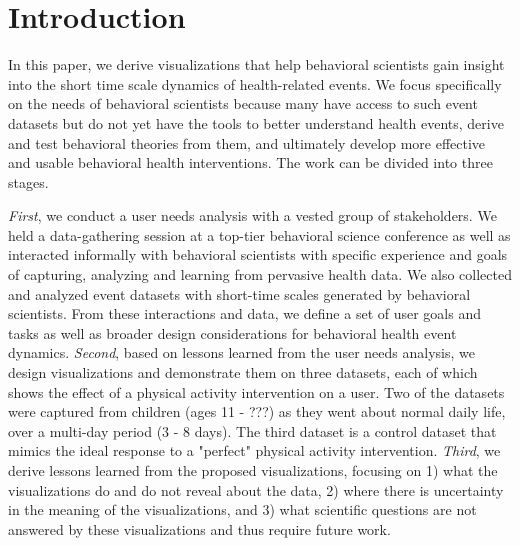 
\section{Introduction} %



In this paper, we derive visualizations that help behavioral scientists gain insight into the short time scale dynamics of health-related events. We focus specifically on the needs of behavioral scientists because many have access to such event datasets but do not yet have the tools to better understand health events, derive and test behavioral theories from them, and ultimately develop more effective and usable behavioral health interventions. The work can be divided into three stages.

\textit{First}, we conduct a user needs analysis with a vested group of stakeholders. We held a data-gathering session at a top-tier behavioral science conference as well as interacted informally with behavioral scientists with specific experience and goals of capturing, analyzing and learning from pervasive health data. We also collected  and analyzed event datasets with short-time scales generated by behavioral scientists. From these interactions and data, we define a set of user goals and tasks as well as broader design considerations for behavioral health event dynamics.  \textit{Second}, based on lessons learned from the user needs analysis, we design visualizations and demonstrate them on three datasets, each of which shows the effect of a physical activity intervention on a user. Two of the datasets were captured from children (ages 11 - ???) as they went about normal daily life, over a multi-day period (3 - 8 days).  The third dataset is a control dataset that mimics the ideal response to a "perfect" physical activity intervention.  \textit{Third}, we derive lessons learned from the proposed visualizations, focusing on 1) what the visualizations do and do not reveal about the data, 2) where there is uncertainty in the meaning of the visualizations, and 3) what scientific questions are not answered by these visualizations and thus require future work.

